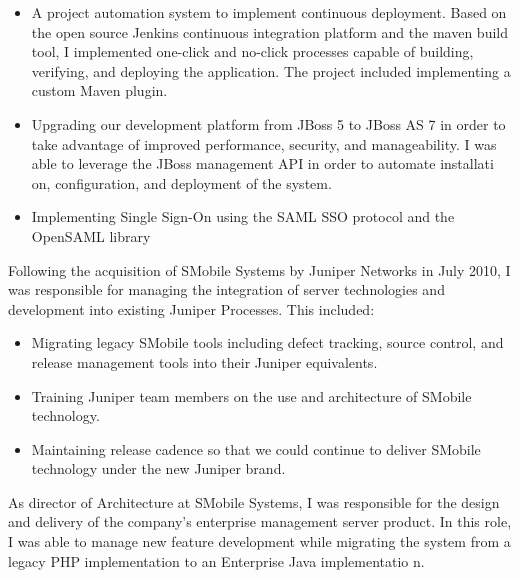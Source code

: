\documentclass{moderncv}
\begin{document}
\begin{itemize}

    \item A project automation system to implement continuous deployment.
        Based on the open source Jenkins continuous integration platform and the
        maven build tool, I implemented one-click and no-click processes capable
        of building, verifying, and deploying the application.
        The project included implementing a custom Maven plugin.

    \item
        Upgrading our development platform from JBoss 5 to JBoss AS 7 in order
        to take advantage of improved performance, security, and manageability.
        I was able to leverage the JBoss management API in order to automate installati
        on, configuration, and deployment of the system.

    \item
        Implementing Single Sign-On using the SAML SSO protocol and the OpenSAML
        library

\end{itemize}


Following the acquisition of SMobile Systems by Juniper Networks in July
2010, I was responsible for managing the integration of server technologies
and development into existing Juniper Processes.
This included:
\begin{itemize}
    \item
        Migrating legacy SMobile tools including defect tracking, source control,
        and release management tools into their Juniper equivalents.
    \item
        Training Juniper team members on the use and architecture of SMobile technology.
    \item
        Maintaining release cadence so that we could continue to deliver SMobile
        technology under the new Juniper brand.
\end{itemize}

As director of Architecture at SMobile Systems, I was responsible for the
design and delivery of the company's enterprise management server product.
In this role, I was able to manage new feature development while migrating
the system from a legacy PHP implementation to an Enterprise Java implementatio
n.
\end{document}
